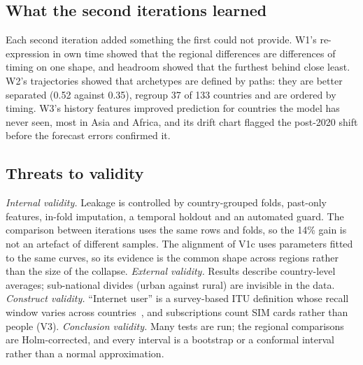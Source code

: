 \documentclass[conference,a4paper]{IEEEtran}
\begin{document}
\subsection{What the second iterations learned}
Each second iteration added something the first could not provide. W1's re-expression in own time
showed that the regional differences are differences of timing on one shape, and headroom showed that
the furthest behind close least. W2's trajectories showed that archetypes are defined by paths: they
are better separated (0.52 against 0.35), regroup 37 of 133 countries and are ordered by timing. W3's
history features improved prediction for countries the model has never seen, most in Asia and Africa,
and its drift chart flagged the post-2020 shift before the forecast errors confirmed it.

\subsection{Threats to validity}
\textit{Internal validity.} Leakage is controlled by country-grouped folds, past-only features,
in-fold imputation, a temporal holdout and an automated guard. The comparison between iterations
uses the same rows and folds, so the 14\% gain is not an artefact of different samples. The alignment
of V1c uses parameters fitted to the same curves, so its evidence is the common shape across regions
rather than the size of the collapse. \textit{External validity.} Results describe country-level
averages; sub-national divides (urban against rural) are invisible in the data. \textit{Construct
validity.} ``Internet user'' is a survey-based ITU definition whose recall window varies across
countries~\cite{itu2023}, and subscriptions count SIM cards rather than people (V3). \textit{Conclusion
validity.} Many tests are run; the regional comparisons are Holm-corrected, and every interval is a
bootstrap or a conformal interval rather than a normal approximation.
\end{document}
